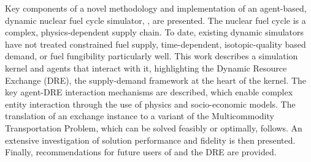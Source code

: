 Key components of a novel methodology and implementation of an agent-based,
dynamic nuclear fuel cycle simulator, \Cyclus, are presented. The nuclear fuel
cycle is a complex, physics-dependent supply chain. To date, existing dynamic
simulators have not treated constrained fuel supply, time-dependent,
isotopic-quality based demand, or fuel fungibility particularly well. This work
describes a simulation kernel and agents that interact with it, highlighting the
Dynamic Resource Exchange (DRE), the supply-demand framework at the heart of the
kernel. The key agent-DRE interaction mechanisms are described, which enable
complex entity interaction through the use of physics and socio-economic
models. The translation of an exchange instance to a variant of the
Multicommodity Transportation Problem, which can be solved feasibly or
optimally, follows. An extensive investigation of solution performance and
fidelity is then presented. Finally, recommendations for future users of \Cyclus
and the DRE are provided.
